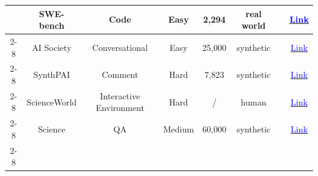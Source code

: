 \begin{table}[!htp]
{\begin{tabular}{c|c|c|c|c|c|c|c}
                                                                                  & SWE-bench              & Code                    & Easy                & 2,294            & real world          & \cite{zhang2024autocoderover}                                                                                                                                                   & \href{https://github.com/princeton-nlp/SWE-bench}{\textcolor{blue}{Link}}                                                                                         \\ \cline{2-8}
                                                                                  & AI Society             & Conversational          & Easy                & 25,000           & synthetic           & \cite{li2023camel}                                                                                                                                                              & \href{https://huggingface.co/camel-ai}{\textcolor{blue}{Link}}                                                                                                    \\ \cline{2-8}
                                                                                  & SynthPAI               & Comment                 & Hard                & 7,823            & synthetic           & \cite{qian2024scaling}                                                                                                                                                          & \href{https://huggingface.co/datasets/RobinSta/SynthPAI}{\textcolor{blue}{Link}}                                                                                  \\ \cline{2-8}
                                                                                  & ScienceWorld           & Interactive Environment & Hard                & /                & human               & \cite{lin2024swiftsage}                                                                                                                                                         & \href{https://github.com/allenai/ScienceWorld}{\textcolor{blue}{Link}}                                                                                            \\ \cline{2-8}
                                                                                  & Science                & QA                      & Medium              & 60,000           & synthetic           & \cite{li2023camel}                                                                                                                                                              & \href{https://huggingface.co/camel-ai}{\textcolor{blue}{Link}}                                                                                                    \\ \cline{2-8}

\end{tabular}}
\end{table}
